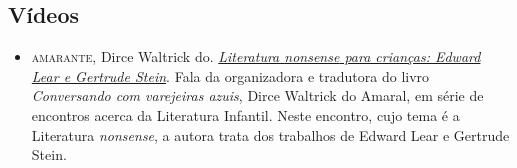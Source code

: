 \documentclass[11pt]{extarticle}
\begin{document}
\subsection{Vídeos}

\begin{itemize}

\item \textsc{amarante}, Dirce Waltrick do. \href{https://www.youtube.com/watch?v=2hhvZFCfLlg}{\textit{Literatura \emph{nonsense} para crianças: Edward Lear e
Gertrude Stein}}. 
Fala da organizadora e tradutora do livro \textit{Conversando com varejeiras azuis}, Dirce Waltrick do Amaral,
em série de encontros acerca da Literatura Infantil. Neste encontro, cujo tema é a Literatura \emph{nonsense},
a autora trata dos trabalhos de Edward Lear e Gertrude Stein.

\end{itemize}
\end{document}
